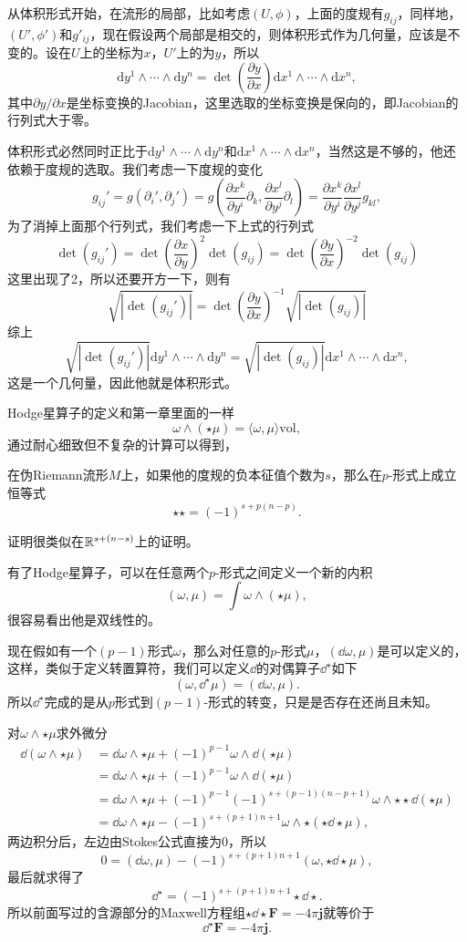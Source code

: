 从体积形式开始，在流形的局部，比如考虑$(U,\phi)$，上面的度规有$g_{ij}$，同样地，$(U',\phi')$和$g'_{ij}$，现在假设两个局部是相交的，则体积形式作为几何量，应该是不变的。设在$U$上的坐标为$x$，$U'$上的为$y$，所以
\[
	\mathrm{d}y^1\wedge \cdots \wedge\mathrm{d}y^n=\det\left(\frac{\partial y}{\partial x}\right)\mathrm{d}x^1\wedge \cdots \wedge \mathrm{d}x^n,
\]
其中$\partial y/\partial x$是坐标变换的Jacobian，这里选取的坐标变换是保向的，即Jacobian的行列式大于零。

体积形式必然同时正比于$\mathrm{d}y^1\wedge \cdots \wedge \mathrm{d}y^n$和$\mathrm{d}x^1\wedge \cdots \wedge \mathrm{d}x^n$，当然这是不够的，他还依赖于度规的选取。我们考虑一下度规的变化
\[
	g_{ij}'=g(\partial_i',\partial_j')=g\left(\frac{\partial x^k}{\partial y^i}\partial_k,\frac{\partial x^l}{\partial y^j}\partial_l\right)=\frac{\partial x^k}{\partial y^i}\frac{\partial x^l}{\partial y^j}g_{kl},
\]
为了消掉上面那个行列式，我们考虑一下上式的行列式
\[
	\det(g_{ij}')=\det\left(\frac{\partial x}{\partial y}\right)^2\det(g_{ij})=\det\left(\frac{\partial y}{\partial x}\right)^{-2}\det(g_{ij})
\]
这里出现了2，所以还要开方一下，则有
\[
	\sqrt{|\det(g_{ij}')|}=\det\left(\frac{\partial y}{\partial x}\right)^{-1}\sqrt{|\det(g_{ij})|}
\]
综上
\[
	\sqrt{|\det(g_{ij}')|}\mathrm{d}y^1\wedge \cdots \wedge \mathrm{d}y^n=\sqrt{|\det(g_{ij})|}\mathrm{d}x^1\wedge \cdots \wedge \mathrm{d}x^n,
\]
这是一个几何量，因此他就是体积形式。

Hodge星算子的定义和第一章里面的一样
\[
	\omega\wedge(\star \mu)=\langle \omega,\mu\rangle \mathrm{vol},
\]
通过耐心细致但不复杂的计算可以得到，
\begin{pro}
在伪Riemann流形$M$上，如果他的度规的负本征值个数为$s$，那么在$p$-形式上成立恒等式
	\[\star\star=(-1)^{s+p(n-p)}.\]
\end{pro}
证明很类似在$\mathbb{R}^{s+(n-s)}$上的证明。

有了Hodge星算子，可以在任意两个$p$-形式之间定义一个新的内积
\[
	(\omega,\mu)=\int \omega\wedge(\star \mu),
\]
很容易看出他是双线性的。

现在假如有一个$(p-1)$形式$\omega$，那么对任意的$p$-形式$\mu$，$(\dd \omega,\mu)$是可以定义的，这样，类似于定义转置算符，我们可以定义$\dd$的对偶算子$\dd^\star$如下
\[
	(\omega,\dd^\star\mu)=(\dd \omega,\mu).
\]
所以$\dd^\star$完成的是从$p$形式到$(p-1)$-形式的转变，只是是否存在还尚且未知。

对$\omega\wedge\star\mu$求外微分
\begin{align*}
	\dd (\omega\wedge\star\mu)&=\dd \omega\wedge\star\mu+(-1)^{p-1}\omega\wedge\dd(\star\mu)\\
	&=\dd \omega\wedge\star\mu+(-1)^{p-1}\omega\wedge\dd(\star\mu)\\
	&=\dd \omega\wedge\star\mu+(-1)^{p-1}(-1)^{s+(p-1)(n-p+1)}\omega\wedge\star\star\dd(\star\mu)\\
	&=\dd \omega\wedge\star\mu-(-1)^{s+(p+1)n+1}\omega\wedge\star(\star\dd\star\mu),
\end{align*}
两边积分后，左边由Stokes公式直接为0，所以
\[
	0=(\dd \omega,\mu)-(-1)^{s+(p+1)n+1}(\omega,\star\dd\star\mu),
\]
最后就求得了
\[
	\dd^\star=(-1)^{s+(p+1)n+1}\star\dd\star.
\]
所以前面写过的含源部分的Maxwell方程组$\star\dd \star \mathbf{F}=-4\pi\mathbf{j}$就等价于
\[
	\dd^\star \mathbf{F}=-4\pi\mathbf{j}.
\]

